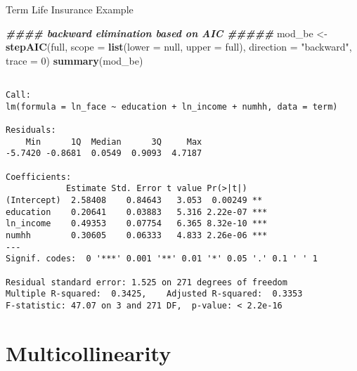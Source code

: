 \documentclass[
  ignorenonframetext,
]{beamer}
\newenvironment{Shaded}{\begin{snugshade}}{\end{snugshade}}
\newcommand{\AttributeTok}[1]{\textcolor[rgb]{0.13,0.29,0.53}{#1}}
\newcommand{\DecValTok}[1]{\textcolor[rgb]{0.00,0.00,0.81}{#1}}
\newcommand{\DocumentationTok}[1]{\textcolor[rgb]{0.56,0.35,0.01}{\textbf{\textit{#1}}}}
\newcommand{\FunctionTok}[1]{\textcolor[rgb]{0.13,0.29,0.53}{\textbf{#1}}}
\newcommand{\NormalTok}[1]{#1}
\newcommand{\OtherTok}[1]{\textcolor[rgb]{0.56,0.35,0.01}{#1}}
\newcommand{\StringTok}[1]{\textcolor[rgb]{0.31,0.60,0.02}{#1}}
\begin{document}
\begin{frame}[fragile]{Term Life Insurance Example}
\protect\hypertarget{term-life-insurance-example-6}{}
\scriptsize

\begin{Shaded}
\begin{Highlighting}[]
\DocumentationTok{\#\#\#\# backward elimination based on AIC \#\#\#\#\#}
\NormalTok{mod\_be }\OtherTok{\textless{}{-}} \FunctionTok{stepAIC}\NormalTok{(full, }\AttributeTok{scope =} \FunctionTok{list}\NormalTok{(}\AttributeTok{lower =}\NormalTok{ null, }\AttributeTok{upper =}\NormalTok{ full), }
                 \AttributeTok{direction =} \StringTok{"backward"}\NormalTok{, }\AttributeTok{trace =} \DecValTok{0}\NormalTok{)}
\FunctionTok{summary}\NormalTok{(mod\_be)}
\end{Highlighting}
\end{Shaded}

\begin{verbatim}

Call:
lm(formula = ln_face ~ education + ln_income + numhh, data = term)

Residuals:
    Min      1Q  Median      3Q     Max 
-5.7420 -0.8681  0.0549  0.9093  4.7187 

Coefficients:
            Estimate Std. Error t value Pr(>|t|)    
(Intercept)  2.58408    0.84643   3.053  0.00249 ** 
education    0.20641    0.03883   5.316 2.22e-07 ***
ln_income    0.49353    0.07754   6.365 8.32e-10 ***
numhh        0.30605    0.06333   4.833 2.26e-06 ***
---
Signif. codes:  0 '***' 0.001 '**' 0.01 '*' 0.05 '.' 0.1 ' ' 1

Residual standard error: 1.525 on 271 degrees of freedom
Multiple R-squared:  0.3425,    Adjusted R-squared:  0.3353 
F-statistic: 47.07 on 3 and 271 DF,  p-value: < 2.2e-16
\end{verbatim}

\normalsize
\end{frame}

\hypertarget{multicollinearity}{%
\section{Multicollinearity}\label{multicollinearity}}
\end{document}
